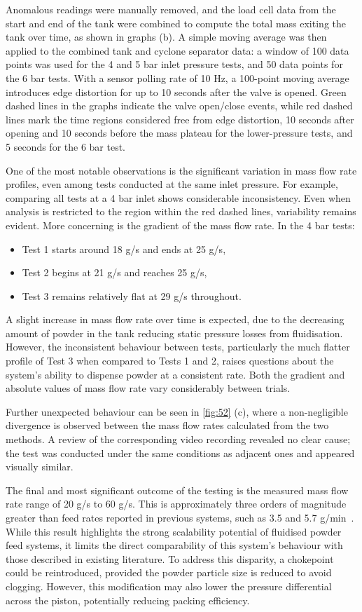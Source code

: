 Anomalous readings were manually removed, and the load cell data from the start and end of the tank were combined to compute the total mass exiting the tank over time, as shown in graphs (b). A simple moving average was then applied to the combined tank and cyclone separator data: a window of 100 data points was used for the 4 and 5 bar inlet pressure tests, and 50 data points for the 6 bar tests. With a sensor polling rate of 10 Hz, a 100-point moving average introduces edge distortion for up to 10 seconds after the valve is opened. Green dashed lines in the graphs indicate the valve open/close events, while red dashed lines mark the time regions considered free from edge distortion, 10 seconds after opening and 10 seconds before the mass plateau for the lower-pressure tests, and 5 seconds for the 6 bar test.

One of the most notable observations is the significant variation in mass flow rate profiles, even among tests conducted at the same inlet pressure. For example, comparing all tests at a 4 bar inlet shows considerable inconsistency. Even when analysis is restricted to the region within the red dashed lines, variability remains evident. More concerning is the gradient of the mass flow rate. In the 4 bar tests:
\begin{itemize}
    \item Test 1 starts around 18 g/s and ends at 25 g/s,
    \item Test 2 begins at 21 g/s and reaches 25 g/s,
    \item Test 3 remains relatively flat at 29 g/s throughout.
\end{itemize}
A slight increase in mass flow rate over time is expected, due to the decreasing amount of powder in the tank reducing static pressure losses from fluidisation. However, the inconsistent behaviour between tests, particularly the much flatter profile of Test 3 when compared to Tests 1 and 2, raises questions about the system's ability to dispense powder at a consistent rate. Both the gradient and absolute values of mass flow rate vary considerably between trials.

Further unexpected behaviour can be seen in \autoref{fig:52} (c), where a non-negligible divergence is observed between the mass flow rates calculated from the two methods. A review of the corresponding video recording revealed no clear cause; the test was conducted under the same conditions as adjacent ones and appeared visually similar.

The final and most significant outcome of the testing is the measured mass flow rate range of 20 g/s to 60 g/s. This is approximately three orders of magnitude greater than feed rates reported in previous systems, such as 3.5 and 5.7 g/min~\cite{BHATTIPROLU20181}. While this result highlights the strong scalability potential of fluidised powder feed systems, it limits the direct comparability of this system's behaviour with those described in existing literature. To address this disparity, a chokepoint could be reintroduced, provided the powder particle size is reduced to avoid clogging. However, this modification may also lower the pressure differential across the piston, potentially reducing packing efficiency.

